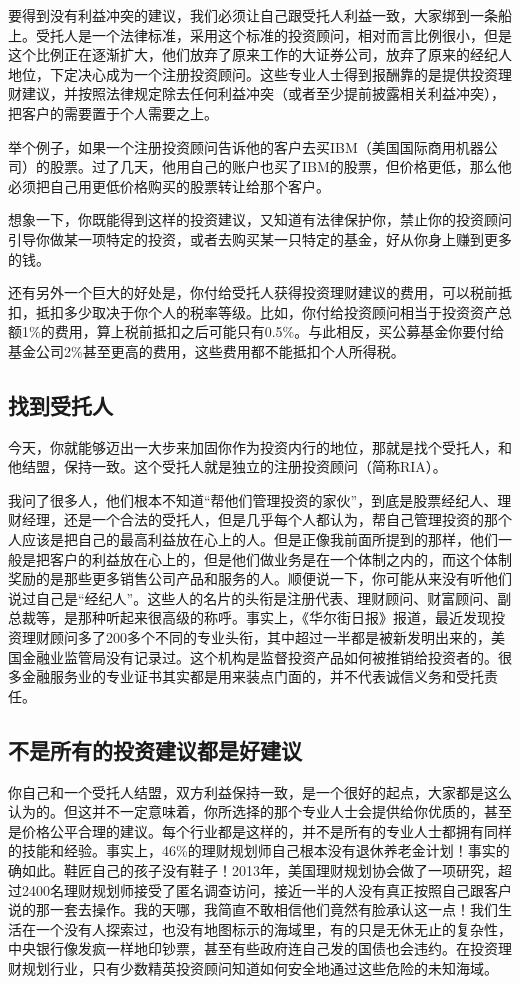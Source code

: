 要得到没有利益冲突的建议，我们必须让自己跟受托人利益一致，大家绑到一条船上。受托人是一个法律标准，采用这个标准的投资顾问，相对而言比例很小，但是这个比例正在逐渐扩大，他们放弃了原来工作的大证券公司，放弃了原来的经纪人地位，下定决心成为一个注册投资顾问。这些专业人士得到报酬靠的是提供投资理财建议，并按照法律规定除去任何利益冲突（或者至少提前披露相关利益冲突），把客户的需要置于个人需要之上。

举个例子，如果一个注册投资顾问告诉他的客户去买IBM（美国国际商用机器公司）的股票。过了几天，他用自己的账户也买了IBM的股票，但价格更低，那么他必须把自己用更低价格购买的股票转让给那个客户。

想象一下，你既能得到这样的投资建议，又知道有法律保护你，禁止你的投资顾问引导你做某一项特定的投资，或者去购买某一只特定的基金，好从你身上赚到更多的钱。

还有另外一个巨大的好处是，你付给受托人获得投资理财建议的费用，可以税前抵扣，抵扣多少取决于你个人的税率等级。比如，你付给投资顾问相当于投资资产总额1\%的费用，算上税前抵扣之后可能只有0.5\%。与此相反，买公募基金你要付给基金公司2\%甚至更高的费用，这些费用都不能抵扣个人所得税。

\subsection{找到受托人}

今天，你就能够迈出一大步来加固你作为投资内行的地位，那就是找个受托人，和他结盟，保持一致。这个受托人就是独立的注册投资顾问（简称RIA）。

我问了很多人，他们根本不知道“帮他们管理投资的家伙”，到底是股票经纪人、理财经理，还是一个合法的受托人，但是几乎每个人都认为，帮自己管理投资的那个人应该是把自己的最高利益放在心上的人。但是正像我前面所提到的那样，他们一般是把客户的利益放在心上的，但是他们做业务是在一个体制之内的，而这个体制奖励的是那些更多销售公司产品和服务的人。顺便说一下，你可能从来没有听他们说过自己是“经纪人”。这些人的名片的头衔是注册代表、理财顾问、财富顾问、副总裁等，是那种听起来很高级的称呼。事实上，《华尔街日报》报道，最近发现投资理财顾问多了200多个不同的专业头衔，其中超过一半都是被新发明出来的，美国金融业监管局没有记录过。这个机构是监督投资产品如何被推销给投资者的。很多金融服务业的专业证书其实都是用来装点门面的，并不代表诚信义务和受托责任。

\subsection{不是所有的投资建议都是好建议}

你自己和一个受托人结盟，双方利益保持一致，是一个很好的起点，大家都是这么认为的。但这并不一定意味着，你所选择的那个专业人士会提供给你优质的，甚至是价格公平合理的建议。每个行业都是这样的，并不是所有的专业人士都拥有同样的技能和经验。事实上，46\%的理财规划师自己根本没有退休养老金计划！事实的确如此。鞋匠自己的孩子没有鞋子！2013年，美国理财规划协会做了一项研究，超过2400名理财规划师接受了匿名调查访问，接近一半的人没有真正按照自己跟客户说的那一套去操作。我的天哪，我简直不敢相信他们竟然有脸承认这一点！我们生活在一个没有人探索过，也没有地图标示的海域里，有的只是无休无止的复杂性，中央银行像发疯一样地印钞票，甚至有些政府连自己发的国债也会违约。在投资理财规划行业，只有少数精英投资顾问知道如何安全地通过这些危险的未知海域。

